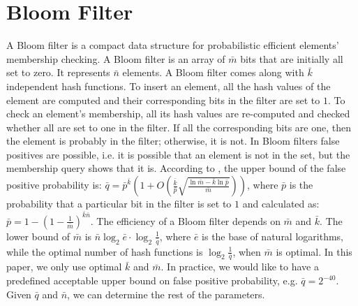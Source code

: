 


\section{Bloom Filter}\label{sec::bloom-filter-}

A Bloom filter \cite{DBLP:journals/cacm/Bloom70} is a compact data structure for probabilistic efficient  elements'  membership checking. A Bloom filter is an array of $\bar  m$ bits that are  initially all set to zero. It  represents $\bar n$  elements.  A Bloom filter comes along with  $\bar k$ independent hash functions. To insert an element, all the  hash values of the element are computed and their corresponding bits in the filter are set to $1$. To check an element's  membership, all its hash values are re-computed and checked whether all are set to one in the filter. If all the corresponding bits are one, then the element is probably in the filter; otherwise, it is not. In Bloom filters false positives are possible, i.e. it is possible that an element is not in the set, but the membership query shows that it is. According to \cite{BoseGKMMMST08}, the upper bound of the false positive probability is: $\bar q=\bar p^{\scriptscriptstyle \bar  k}(1+O(\frac{\bar k}{\bar p}\sqrt{\frac{\ln \bar m - \bar k \ln \bar  p}{\bar m}}))$,  where $\bar p$ is the probability that a particular bit in the filter is set to $1$ and calculated as: $\bar p=1-(1-\frac{1}{\bar m})^{\scriptscriptstyle \bar k\bar n}$. The efficiency of a Bloom filter depends
on  $\bar m$ and $\bar k$. The lower bound of $\bar m$  is $\bar  n \log_{\scriptscriptstyle 2}
\bar e \cdot\log_{\scriptscriptstyle 2} \frac{1}{\bar q}$, where $\bar e$ is the base of natural logarithms,  while the optimal number of hash functions is    $\log_{\scriptscriptstyle 2} \frac{1}{\bar q}$, when $\bar m$ is optimal. In this paper, we only use optimal $\bar k$ and $\bar m$. In practice, we would like to have a predefined acceptable upper bound on false positive probability, e.g. $\bar q=2^{\scriptscriptstyle - 40}$. Given $\bar q$ and $\bar n$, we can determine the rest  of the parameters. 

